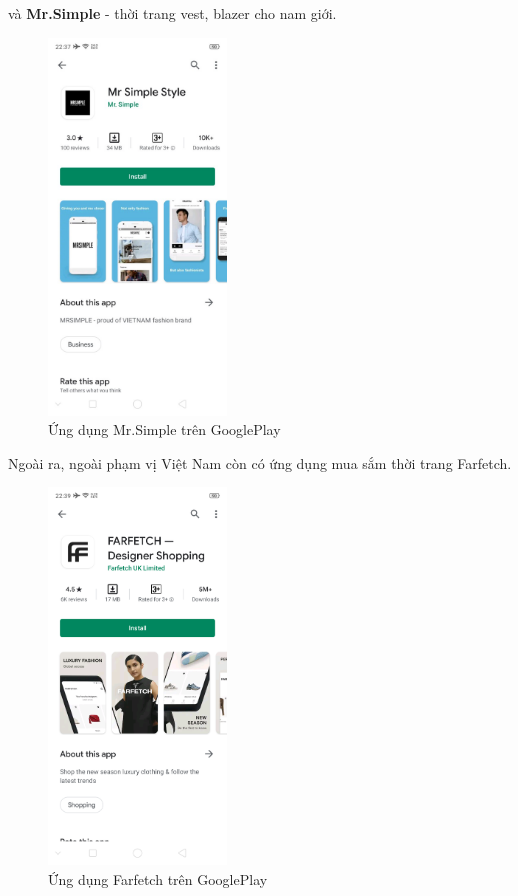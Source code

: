 \documentclass[12pt]{article}
\begin{document}
\indent và \textbf{Mr.Simple} - thời trang vest, blazer cho nam giới.

\begin{figure}[H]
    \centering
    \includegraphics[height=10cm]{images/02.png}
    \caption{Ứng dụng Mr.Simple trên GooglePlay}
\end{figure}

\newpage
\indent Ngoài ra, ngoài phạm vị Việt Nam còn có ứng dụng mua sắm thời trang Farfetch.

\begin{figure}[H]
    \centering
    \includegraphics[height=10cm]{images/03.png}
    \caption{Ứng dụng Farfetch trên GooglePlay}
\end{figure}
\end{document}
